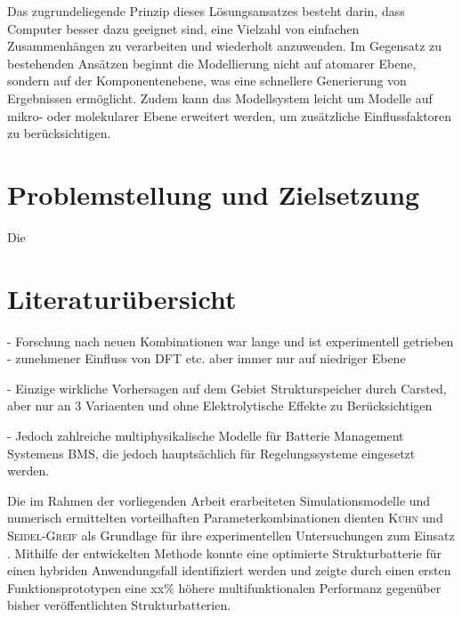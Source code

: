 Das zugrundeliegende Prinzip dieses Lösungsansatzes besteht darin, dass Computer besser dazu geeignet sind, eine Vielzahl von einfachen Zusammenhängen zu verarbeiten und wiederholt anzuwenden. Im Gegensatz zu bestehenden Ansätzen beginnt die Modellierung nicht auf atomarer Ebene, sondern auf der Komponentenebene, was eine schnellere Generierung von Ergebnissen ermöglicht. Zudem kann das Modellsystem leicht um Modelle auf mikro- oder molekularer Ebene erweitert werden, um zusätzliche Einflussfaktoren zu berücksichtigen.

\section{\label{sec:Motivation_Zielstellung}Problemstellung und Zielsetzung}

Die 

\section{\label{sec:Literaturübersicht}Literaturübersicht}
- Forschung nach neuen Kombinationen war lange und ist experimentell getrieben
- zunehmener Einfluss von DFT etc. aber immer nur auf niedriger Ebene

- Einzige wirkliche Vorhersagen auf dem Gebiet Strukturspeicher durch Carsted, aber nur an 3 Variaenten und ohne Elektrolytische Effekte zu Berücksichtigen 

- Jedoch zahlreiche multiphysikalische Modelle für Batterie Management Systemens BMS, die jedoch hauptsächlich für Regelungssysteme eingesetzt werden.

Die im Rahmen der vorliegenden Arbeit erarbeiteten Simulationsmodelle und numerisch ermittelten vorteilhaften Parameterkombinationen dienten \textsc{Kühn} und \textsc{Seidel-Greif} als Grundlage für ihre experimentellen Untersuchungen zum Einsatz .
Mithilfe der entwickelten Methode konnte eine optimierte  Strukturbatterie für einen hybriden Anwendungsfall identifiziert werden und zeigte durch einen ersten Funktionsprototypen eine xx\% höhere multifunktionalen Performanz gegenüber bisher veröffentlichten Strukturbatterien.









   

